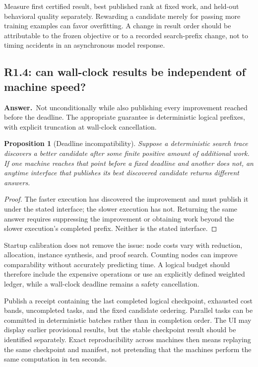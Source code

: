 \documentclass[11pt,a4paper]{article}
\newtheorem{proposition}{Proposition}[section]
\theoremstyle{definition}
\theoremstyle{remark}
\newcommand{\ans}{\noindent\textbf{Answer.}\ }
\begin{document}
Measure first certified result, best published rank at fixed work, and
held-out behavioral quality separately. Rewarding a candidate merely for
passing more training examples can favor overfitting. A change in result order
should be attributable to the frozen objective or to a recorded search-prefix
change, not to timing accidents in an asynchronous model response.

\subsection{R1.4: can wall-clock results be independent of machine speed?}\label{q:R1.4}
\ans Not unconditionally while also publishing every improvement reached
before the deadline. The appropriate guarantee is deterministic logical
prefixes, with explicit truncation at wall-clock cancellation.

\begin{proposition}[Deadline incompatibility]
Suppose a deterministic search trace discovers a better candidate after some
finite positive amount of additional work. If one machine reaches that point
before a fixed deadline and another does not, an anytime interface that
publishes its best discovered candidate returns different answers.
\end{proposition}
\begin{proof}
The faster execution has discovered the improvement and must publish it under
the stated interface; the slower execution has not. Returning the same answer
requires suppressing the improvement or obtaining work beyond the slower
execution's completed prefix. Neither is the stated interface.
\end{proof}

Startup calibration does not remove the issue: node costs vary with reduction,
allocation, instance synthesis, and proof search. Counting nodes can improve
comparability without accurately predicting time. A logical budget should
therefore include the expensive operations or use an explicitly defined
weighted ledger, while a wall-clock deadline remains a safety cancellation.

Publish a receipt containing the last completed logical checkpoint, exhausted
cost bands, uncompleted tasks, and the fixed candidate ordering. Parallel tasks
can be committed in deterministic batches rather than in completion order.
The UI may display earlier provisional results, but the stable checkpoint
result should be identified separately. Exact reproducibility across machines
then means replaying the same checkpoint and manifest, not pretending that the
machines perform the same computation in ten seconds.
\end{document}
